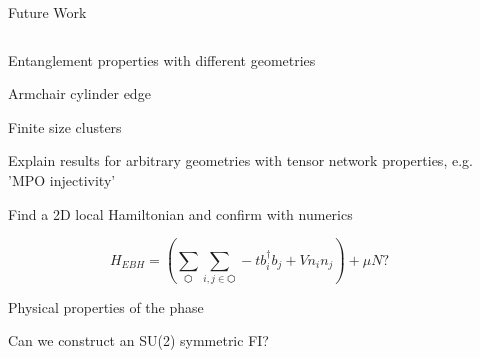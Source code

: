 \begin{frame}{Future Work}
\vskip-2cm

\begin{columns}[T]
    \begin{column}[T]{.9\textwidth}

\begin{block}{}
	\bi
	\item[] Entanglement properties with different geometries
		\bi
		\item Armchair cylinder edge %
		\item Finite size clusters 
		\item Explain results for arbitrary geometries with tensor network properties, e.g. 'MPO injectivity'
		\ei
	\item[] Find a 2D local Hamiltonian and confirm with numerics
	
		\item[] \vskip-0.5cm $$H_{EBH} = \left(\sum\limits_{\varhexagon} \sum\limits_{i,j \in \varhexagon} -t b^{\dagger}_i b_j + V n_i n_j \right) +\mu N ?$$ 
	\item[] Physical properties of the phase
	\item[] Can we construct%
	 an SU(2) symmetric FI?
	\ei	
\end{block}

    \end{column}
    \begin{column}[T]{.1\textwidth}
    \end{column}
\end{columns}
\end{frame}